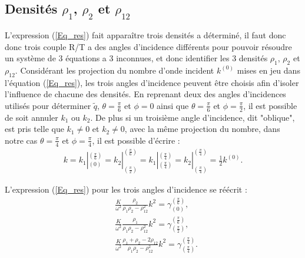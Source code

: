 \documentclass[12pt]{report}
\begin{document}
\subsection{Densités $\rho_1$, $\rho_2$ et $\rho_{12}$}
\label{Ch_Inv_S_rho_SS_rho1/2/12}
    L'expression (\ref{Eq_res}) fait apparaître trois densités a déterminé, il faut donc donc trois couple R/T a des angles d'incidence différents pour pouvoir résoudre un système de 3 équations a 3 inconnues, et donc identifier les 3 densités $\rho_1$, $\rho_2$ et $\rho_{12}$.
    Considérant les projection du nombre d'onde incident $k^{(0)}$ mises en jeu dans l'équation (\ref{Eq_res}), les trois angles d'incidence peuvent être choisis afin d'isoler l'influence de chacune des densités. En reprenant deux des angles d'incidences utilisés pour déterminer $\tilde{q}$, $\theta=\frac{\pi}{6}$ et $\phi=0$ ainsi que $\theta=\frac{\pi}{6}$ et $\phi=\frac{\pi}{2}$, il est possible de soit annuler $k_1$ ou $k_2$. De plus si un troisième angle d'incidence, dit "oblique", est pris telle que $k_1\ne 0$ et $k_2\ne 0$, avec la même projection du nombre, dans notre cas $\theta=\frac{\pi}{4}$ et $\phi=\frac{\pi}{4}$, il est possible d'écrire :
    \begin{align}
        k=k_1|^{(\frac{\pi}{6})}_{(0)}=k_2|^{(\frac{\pi}{6})}_{(\frac{\pi}{2})}=k_1|^{(\frac{\pi}{4})}_{(\frac{\pi}{4})}=k_2|^{(\frac{\pi}{4})}_{(\frac{\pi}{4})}=\frac{1}{2}k^{(0)}.
    \end{align}
    
    L'expression (\ref{Eq_res}) pour les trois angles d'incidence se réécrit :
        \begin{align}
    &\frac{K}{\omega^2}\frac{\rho_2}{\rho_1\rho_2-\rho_{12}^2}k^2=\gamma^{(\frac{\pi}{6})}_{(0)}\label{Comp_1},\\ &\frac{K}{\omega^2}\frac{\rho_1}{\rho_1\rho_2-\rho_{12}^2}k^2=\gamma^{(\frac{\pi}{6})}_{(\frac{\pi}{2})}\label{Comp_2},\\ &\frac{K}{\omega^2}\frac{\rho_1+\rho_2-2\rho_{12}}{\rho_1\rho_2-\rho_{12}^2}k^2=\gamma^{(\frac{\pi}{4})}_{(\frac{\pi}{4})}\label{Comp_3}.
    \end{align}
\end{document}
